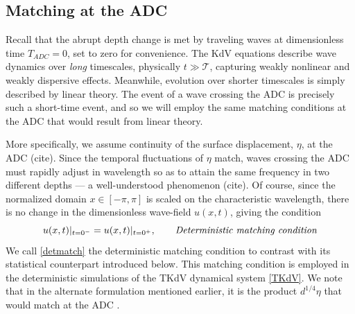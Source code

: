 \documentclass[11pt]{article}
\newcommand{\nick}[1]{{\color{red} #1}}
\newcommand{\depth}{d}
\newcommand{\timescale}{\mathcal{T}}
\begin{document}
\subsection{Matching at the ADC}

	Recall that the abrupt depth change is met by traveling waves at dimensionless time $T_{ADC} = 0$, set to zero for convenience. The KdV equations describe wave dynamics over {\em long} timescales, physically $t \gg \timescale$, capturing weakly nonlinear and weakly dispersive effects. Meanwhile, evolution over shorter timescales is simply described by linear theory. The event of a wave crossing the ADC is precisely such a short-time event, and so we will employ the same matching conditions at the ADC that would result from linear theory. 

	More specifically, we assume continuity of the surface displacement, $\eta$, at the ADC \nick{(cite)}. Since the temporal fluctuations of $\eta$ match, waves crossing the ADC must rapidly adjust in wavelength so as to attain the same frequency in two different depths --- a well-understood phenomenon \nick{(cite)}. Of course, since the normalized domain $x \in [-\pi,\pi]$ is scaled on the characteristic wavelength, there is no change in the dimensionless wave-field $u(x,t)$, giving the condition
\begin{equation}
\label{detmatch}
u(x,t) \vert_{t=0^-} = u(x,t) \vert_{t=0^+}, 
\qquad \mbox{\em Deterministic matching condition}
\end{equation}	
We call \eqref{detmatch} the deterministic matching condition to contrast with its statistical counterpart introduced below. This matching condition is employed in the deterministic simulations of the TKdV dynamical system \eqref{TKdV}. We note that in the alternate formulation mentioned earlier, it is the product $\depth^{1/4} \eta$ that would match at the ADC \cite{johnson1997modern}.
\end{document}
